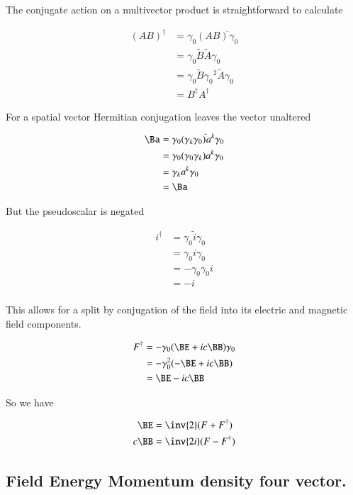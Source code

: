 The conjugate action on a multivector product is straightforward to calculate

\begin{align*}
(A B)^\dagger
&= \gamma_0 (A B)^{\tilde{}} \gamma_0 \\
&= \gamma_0 \tilde{B} \tilde{A} \gamma_0 \\
&= \gamma_0 \tilde{B} {\gamma_0}^2 \tilde{A} \gamma_0 \\
&= B^\dagger A^\dagger
\end{align*}

For a spatial vector Hermitian conjugation leaves the vector unaltered

\begin{align*}
\Ba
&= \gamma_0 (\gamma_k \gamma_0)^{\tilde{}} a^k \gamma_0 \\
&= \gamma_0 (\gamma_0 \gamma_k) a^k \gamma_0 \\
&= \gamma_k a^k \gamma_0 \\
&= \Ba
\end{align*}

But the pseudoscalar is negated

\begin{align*}
i^\dagger
&=
\gamma_0 \tilde{i} \gamma_0 \\
&=
\gamma_0 i \gamma_0 \\
&=
-\gamma_0 \gamma_0 i \\
&=
- i \\
\end{align*}

This allows for a split by conjugation of the field into its electric and magnetic field components.

\begin{align*}
F^\dagger
&= -\gamma_0 ( \BE + i c \BB) \gamma_0 \\
&= -\gamma_0^2 ( -\BE + i c \BB) \\
&= \BE - i c\BB \\
\end{align*}

So we have

\begin{align}\label{eqn:conjuagateSplit}
\BE &= \inv{2}(F + F^\dagger) \\
c \BB &= \inv{2i}(F - F^\dagger)
\end{align}

\subsection{ Field Energy Momentum density four vector.}

